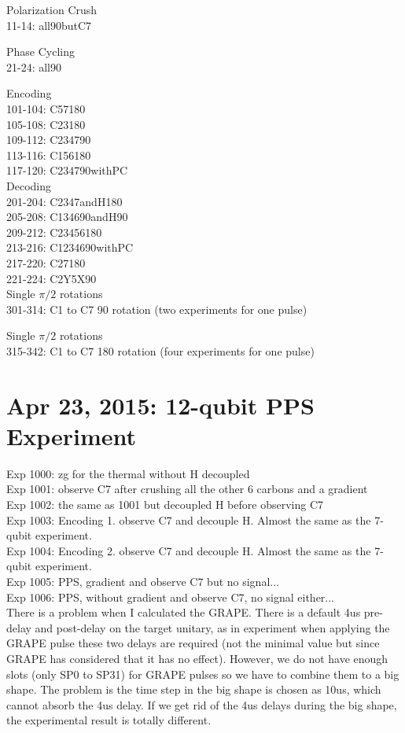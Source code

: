 \documentclass[prl,onecolumn]{revtex4-1}
\begin{document}
Polarization Crush \\
11-14: all90butC7

Phase Cycling \\
21-24: all90

Encoding \\
101-104: C57180 \\
105-108: C23180 \\
109-112: C234790 \\
113-116: C156180 \\
117-120: C234790withPC \\

Decoding \\
201-204: C2347andH180 \\
205-208: C134690andH90 \\
209-212: C23456180 \\
213-216: C1234690withPC \\
217-220: C27180 \\
221-224: C2Y5X90 \\

Single $\pi/2$ rotations \\
301-314: C1 to C7 90 rotation (two experiments for one pulse)

Single $\pi/2$ rotations \\
315-342: C1 to C7 180 rotation (four experiments for one pulse)

\newpage
\section{Apr 23, 2015: 12-qubit PPS Experiment}

Exp 1000: zg for the thermal without H decoupled \\
Exp 1001: observe C7 after crushing all the other 6 carbons and a gradient \\
Exp 1002: the same as 1001 but decoupled H before observing C7 \\
Exp 1003: Encoding 1. observe C7 and decouple H. Almost the same as the 7-qubit experiment. \\
Exp 1004: Encoding 2. observe C7 and decouple H. Almost the same as the 7-qubit experiment. \\
Exp 1005: PPS, gradient and observe C7 but no signal... \\
Exp 1006: PPS, without gradient and observe C7, no signal either... \\

There is a problem when I calculated the GRAPE. There is a default 4us pre-delay and post-delay on the target unitary, as in experiment when applying the GRAPE pulse these two delays are required (not the minimal value but since GRAPE has considered that it has no effect). However, we do not have enough slots (only SP0 to SP31) for GRAPE pulses so we have to combine them to a big shape. The problem is the time step in the big shape is chosen as 10us, which cannot absorb the 4us delay. If we get rid of the 4us delays during the big shape, the experimental result is totally different.
\end{document}

